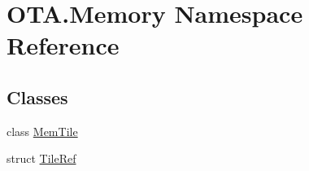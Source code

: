 \hypertarget{namespaceOTA_1_1Memory}{}\section{O\+T\+A.\+Memory Namespace Reference}
\label{namespaceOTA_1_1Memory}
\subsection*{Classes}
\begin{DoxyCompactItemize}
\item 
class \hyperlink{classOTA_1_1Memory_1_1MemTile}{Mem\+Tile}
\item 
struct \hyperlink{structOTA_1_1Memory_1_1TileRef}{Tile\+Ref}
\end{DoxyCompactItemize}
